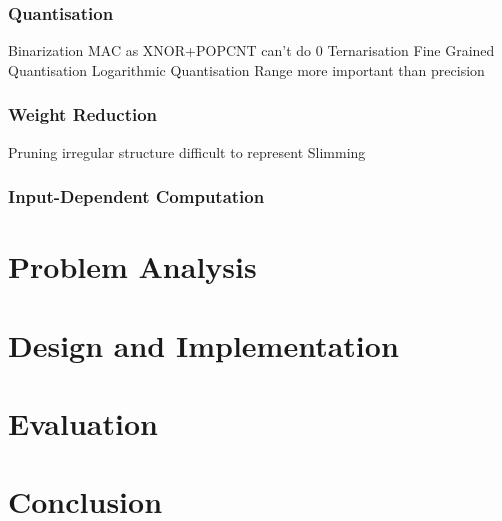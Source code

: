 \documentclass[12pt]{article}
\begin{document}
\subsubsection{Quantisation}
Binarization
  MAC as XNOR+POPCNT
  can't do 0
Ternarisation
Fine Grained Quantisation
Logarithmic Quantisation
  Range more important than precision
\subsubsection{Weight Reduction}
Pruning
  irregular structure difficult to represent
Slimming

\subsubsection{Input-Dependent Computation}



\section{Problem Analysis}

\section{Design and Implementation}

\section{Evaluation}

\section{Conclusion}


\end{document}
